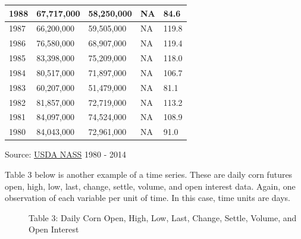 \documentclass[]{book}
\theoremstyle{definition}
\theoremstyle{definition}
\theoremstyle{remark}
\begin{document}
\begin{tabular}{l|l|l|l|l}
\hline
1988 & 67,717,000 & 58,250,000 & NA & 84.6\\
\hline
1987 & 66,200,000 & 59,505,000 & NA & 119.8\\
\hline
1986 & 76,580,000 & 68,907,000 & NA & 119.4\\
\hline
1985 & 83,398,000 & 75,209,000 & NA & 118.0\\
\hline
1984 & 80,517,000 & 71,897,000 & NA & 106.7\\
\hline
1983 & 60,207,000 & 51,479,000 & NA & 81.1\\
\hline
1982 & 81,857,000 & 72,719,000 & NA & 113.2\\
\hline
1981 & 84,097,000 & 74,524,000 & NA & 108.9\\
\hline
1980 & 84,043,000 & 72,961,000 & NA & 91.0\\
\hline
\end{tabular}

Source: \href{http://www.nass.usda.gov/}{USDA NASS} 1980 - 2014

\begin{description}
\item[Table 3 below is another example of a time series. These are daily
corn futures open, high, low, last, change, settle, volume, and open
interest data. Again, one observation of each variable per unit of time.
In this case, time units are days.]
Table 3: Daily Corn Open, High, Low, Last, Change, Settle, Volume, and
Open Interest
\end{description}
\end{document}
